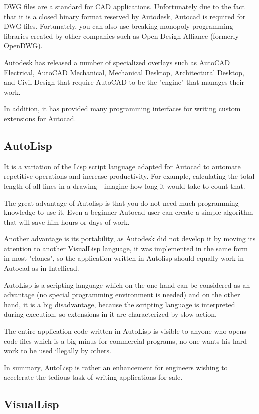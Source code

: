 \documentclass[a4paper, 11pt, article]{report}
\begin{document}
DWG files are a standard for CAD applications. Unfortunately due to the fact that it is a closed binary format reserved by Autodesk, Autocad is required for DWG files. Fortunately, you can also use breaking monopoly programming libraries created by other companies such as Open Design Alliance (formerly OpenDWG).

Autodesk has released a number of specialized overlays such as AutoCAD Electrical, AutoCAD Mechanical, Mechanical Desktop, Architectural Desktop, and Civil Design that require AutoCAD to be the "engine" that manages their work.

In addition, it has provided many programming interfaces for writing custom extensions for Autocad.

\subsection{AutoLisp}

It is a variation of the Lisp script language adapted for Autocad to automate repetitive operations and increase productivity. For example, calculating the total length of all lines in a drawing - imagine how long it would take to count that.

The great advantage of Autolisp is that you do not need much programming knowledge to use it. Even a beginner Autocad user can create a simple algorithm that will save him hours or days of work.

Another advantage is its portability, as Autodesk did not develop it by moving its attention to another VisualLisp language, it was implemented in the same form in most "clones", so the application written in Autolisp should equally work in Autocad as in Intellicad.

AutoLisp is a scripting language which on the one hand can be considered as an advantage (no special programming environment is needed) and on the other hand, it is a big disadvantage, because the scripting language is interpreted during execution, so extensions in it are characterized by slow action.

The entire application code written in AutoLisp is visible to anyone who opens code files which is a big minus for commercial programs, no one wants his hard work to be used illegally by others.

In summary, AutoLisp is rather an enhancement for engineers wishing to accelerate the tedious task of writing applications for sale.

\subsection{VisualLisp}
\end{document}
